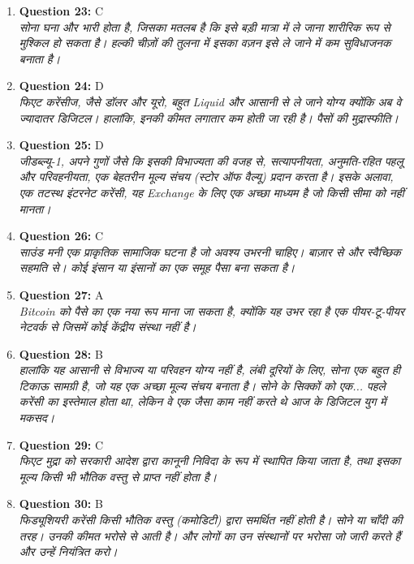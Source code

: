 \documentclass[12pt,a4paper]{article}
\begin{document}
\begin{enumerate}
\item \textbf{Question 23:} C
\\ \textit{सोना घना और भारी होता है, जिसका मतलब है कि इसे बड़ी मात्रा में ले जाना शारीरिक रूप से मुश्किल हो सकता है। हल्की चीज़ों की तुलना में इसका वज़न इसे ले जाने में कम सुविधाजनक बनाता है।}

\item \textbf{Question 24:} D
\\ \textit{फिएट करेंसीज, जैसे डॉलर और यूरो, बहुत Liquid और आसानी से ले जाने योग्य क्योंकि अब वे ज्यादातर डिजिटल। हालांकि, इनकी कीमत लगातार कम होती जा रही है। पैसों की मुद्रास्फीति।}

\item \textbf{Question 25:} D
\\ \textit{जीडब्ल्यू-1, अपने गुणों जैसे कि इसकी विभाज्यता की वजह से, सत्यापनीयता, अनुमति-रहित पहलू और परिवहनीयता, एक बेहतरीन मूल्य संचय (स्टोर ऑफ वैल्यू) प्रदान करता है। इसके अलावा, एक तटस्थ इंटरनेट करेंसी, यह Exchange के लिए एक अच्छा माध्यम है जो किसी सीमा को नहीं मानता।}

\item \textbf{Question 26:} C
\\ \textit{साउंड मनी एक प्राकृतिक सामाजिक घटना है जो अवश्य उभरनी चाहिए। बाज़ार से और स्वैच्छिक सहमति से। कोई इंसान या इंसानों का एक समूह पैसा बना सकता है।}

\item \textbf{Question 27:} A
\\ \textit{Bitcoin को पैसे का एक नया रूप माना जा सकता है, क्योंकि यह उभर रहा है एक पीयर-टू-पीयर नेटवर्क से जिसमें कोई केंद्रीय संस्था नहीं है।}

\item \textbf{Question 28:} B
\\ \textit{हालांकि यह आसानी से विभाज्य या परिवहन योग्य नहीं है, लंबी दूरियों के लिए, सोना एक बहुत ही टिकाऊ सामग्री है, जो यह एक अच्छा मूल्य संचय बनाता है। सोने के सिक्कों को एक... पहले करेंसी का इस्तेमाल होता था, लेकिन वे एक जैसा काम नहीं करते थे आज के डिजिटल युग में मकसद।}

\item \textbf{Question 29:} C
\\ \textit{फिएट मुद्रा को सरकारी आदेश द्वारा कानूनी निविदा के रूप में स्थापित किया जाता है, तथा इसका मूल्य किसी भी भौतिक वस्तु से प्राप्त नहीं होता है।}

\item \textbf{Question 30:} B
\\ \textit{फिड्यूशियरी करेंसी किसी भौतिक वस्तु (कमोडिटी) द्वारा समर्थित नहीं होती है। सोने या चाँदी की तरह। उनकी कीमत भरोसे से आती है। और लोगों का उन संस्थानों पर भरोसा जो जारी करते हैं और उन्हें नियंत्रित करो।}


\end{enumerate}
\end{document}
